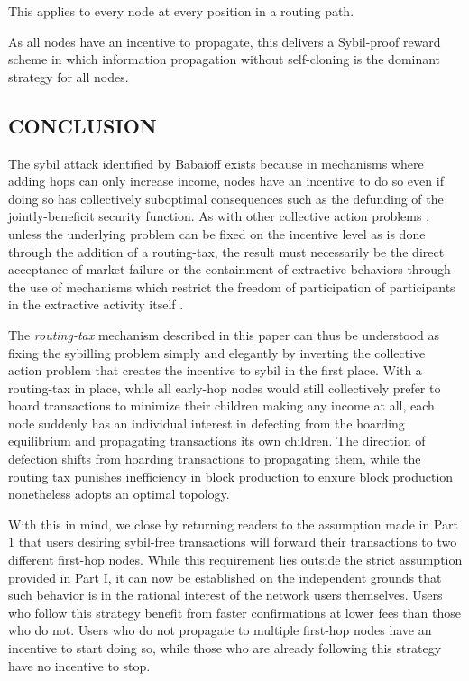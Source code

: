 \documentclass[oneside]{article}   	%
\begin{document}
\begin{multicols}{2}
This applies to every node at every position in a routing path.

As all nodes have an incentive to propagate, this delivers a Sybil-proof reward scheme in which information propagation without self-cloning is the dominant strategy for all nodes.


\subsection*{CONCLUSION}

The sybil attack identified by Babaioff exists because in mechanisms where adding hops can only increase income, nodes have an incentive to do so even if doing so has collectively suboptimal consequences such as the defunding of the jointly-beneficit security function. As with other collective action problems \cite{olson1971logic}, unless the underlying problem can be fixed on the incentive level as is done through the addition of a routing-tax, the result must necessarily be the direct acceptance of market failure \cite{DBLP:journals/corr/abs-2110-10606} or the containment of extractive behaviors through the use of mechanisms which restrict the freedom of participation of participants in the extractive activity itself \cite{DBLP:journals/corr/AbrahamMNRS16} \cite{DBLP:journals/corr/abs-1712-07564}.

The \textit{routing-tax} mechanism described in this paper can thus be understood as fixing the sybilling problem simply and elegantly by inverting the collective action problem that creates the incentive to sybil in the first place. With a routing-tax in place, while all early-hop nodes would still collectively prefer to hoard transactions to minimize their children making any income at all, each node suddenly has an individual interest in defecting from the hoarding equilibrium and propagating transactions its own children. The direction of defection shifts from hoarding transactions to propagating them, while the routing tax punishes inefficiency in block production to enxure block production nonetheless adopts an optimal topology.

With this in mind, we close by returning readers to the assumption made in Part 1 that users desiring sybil-free transactions will forward their transactions to two different first-hop nodes. While this requirement lies outside the strict assumption provided in Part I, it can now be established on the independent grounds that such behavior is in the rational interest of the network users themselves. Users who follow this strategy benefit from faster confirmations at lower fees than those who do not. Users who do not propagate to multiple first-hop nodes have an incentive to start doing so, while those who are already following this strategy have no incentive to stop.

\end{multicols} 
\end{document}
